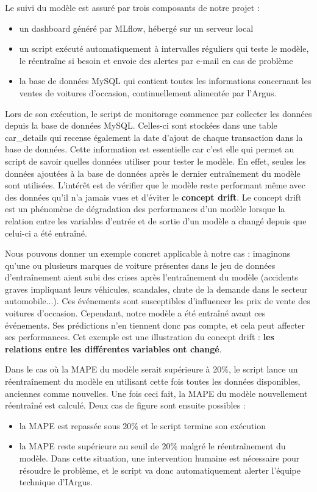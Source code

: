 \documentclass[french]{article}
\begin{document}
    Le suivi du modèle est assuré par trois composants de notre projet :
    \begin{itemize}
        \item un dashboard généré par MLflow, hébergé sur un serveur local
        \item un script exécuté automatiquement à intervalles réguliers qui teste le modèle, le réentraîne si besoin et envoie des alertes par e-mail en cas de problème
        \item la base de données MySQL qui contient toutes les informations concernant les ventes de voitures d'occasion, continuellement alimentée par l'Argus.
    \end{itemize}


    Lors de son exécution, le script de monitorage commence par collecter les données depuis la base de données MySQL. Celles-ci sont stockées dans une table car\_details qui recense également la date d'ajout de chaque transaction dans la base de données. Cette information est essentielle car c'est elle qui permet au script de savoir quelles données utiliser pour tester le modèle. En effet, seules les données ajoutées à la base de données après le dernier entraînement du modèle sont utilisées. L'intérêt est de vérifier que le modèle reste performant même avec des données qu'il n'a jamais vues et d'éviter le \textbf{concept drift}. Le concept drift est un phénomène de dégradation des performances d'un modèle lorsque la relation entre les variables d'entrée et de sortie d'un modèle a changé depuis que celui-ci a été entraîné. 
    
    Nous pouvons donner un exemple concret applicable à notre cas : imaginons qu'une ou plusieurs marques de voiture présentes dans le jeu de données d'entraînement aient subi des crises après l'entraînement du modèle (accidents graves impliquant leurs véhicules, scandales, chute de la demande dans le secteur automobile...). Ces événements sont susceptibles d'influencer les prix de vente des voitures d'occasion. Cependant, notre modèle a été entraîné avant ces événements. Ses prédictions n'en tiennent donc pas compte, et cela peut affecter ses performances. Cet exemple est une illustration du concept drift : \textbf{les relations entre les différentes variables ont changé}.

    

    Dans le cas où la MAPE du modèle serait supérieure à 20\%, le script lance un réentraînement du modèle en utilisant cette fois toutes les données disponibles, anciennes comme nouvelles. Une fois ceci fait, la MAPE du modèle nouvellement réentraîné est calculé. Deux cas de figure sont ensuite possibles :
    \begin{itemize}
        \item la MAPE est repassée sous 20\% et le script termine son exécution
        \item la MAPE reste supérieure au seuil de 20\% malgré le réentraînement du modèle. Dans cette situation, une intervention humaine est nécessaire pour résoudre le problème, et le script va donc automatiquement alerter l'équipe technique d'IArgus.
    \end{itemize}
\end{document}
